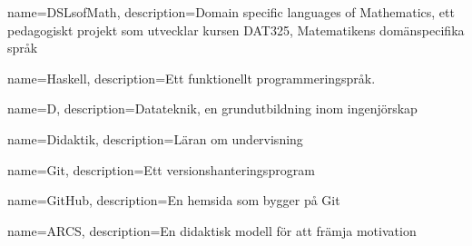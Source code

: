 
{
    name=DSLsofMath,
    description={Domain specific languages of Mathematics, ett pedagogiskt projekt som utvecklar kursen DAT325, Matematikens domänspecifika språk}
}


{
	name=Haskell,
	description={Ett funktionellt programmeringspråk.}
}

{
    name=D,
    description={Datateknik, en grundutbildning inom ingenjörskap}
}

{
    name=Didaktik,
    description={Läran om undervisning}
}

{
    name=Git,
    description={Ett versionshanteringsprogram}
}

{
    name=GitHub,
    description={En hemsida som bygger på Git}
}

{
    name=ARCS,
    description={En didaktisk modell för att främja motivation}
}




